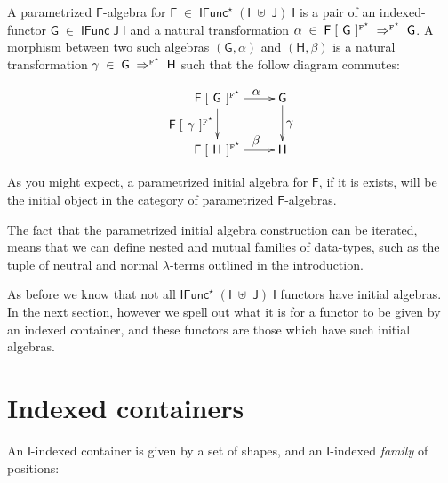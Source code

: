 \documentclass[a4paper]{article}
\newcommand{\Conid}[1]{\mathit{#1}}
\newcommand{\Varid}[1]{\mathit{#1}}
\renewcommand\Varid[1]{\mathord{\textsf{#1}}}
\let\Conid\Varid
\begin{document}
\noindent
A parametrized \ensuremath{\Conid{F}}-algebra for \ensuremath{\Conid{F}\;\in\;\Conid{IFunc}^{\star}\;(\Conid{I}\;\uplus\;\Conid{J})\;\Conid{I}} is a pair of an 
indexed-functor \ensuremath{\Conid{G}\;\in\;\Conid{IFunc}\;\Conid{J}\;\Conid{I}} and a natural transformation
\ensuremath{\alpha\;\in\;\Conid{F}\;[\mskip1.5mu \;\Conid{G}\;\mskip1.5mu]^{\text{\tiny{F}}^{\star}}\;\Rightarrow^{\text{\tiny F}^{\star}}\;\Conid{G}}. A morphism between two such algebras 
\ensuremath{(\Conid{G},\alpha)} and \ensuremath{(\Conid{H},\beta)} is a natural transformation \ensuremath{\gamma\;\in\;\Conid{G}\;\Rightarrow^{\text{\tiny F}^{\star}}\;\Conid{H}} 
such that the follow diagram commutes:

\[
\xymatrix{
\mbox{\ensuremath{\Conid{F}\;[\mskip1.5mu \;\Conid{G}\;\mskip1.5mu]^{\text{\tiny{F}}^{\star}}}}  \ar[r]^{\quad\mbox{\ensuremath{\alpha}}} 
\ar[d]_{\mbox{\ensuremath{\Conid{F}\;[\mskip1.5mu \;\gamma\;\mskip1.5mu]^{\text{\tiny{F}}^{\star}}}}} & \mbox{\ensuremath{\Conid{G}}} \ar[d]^{\mbox{\ensuremath{\gamma}}}\\
\mbox{\ensuremath{\Conid{F}\;[\mskip1.5mu \;\Conid{H}\;\mskip1.5mu]^{\text{\tiny{F}}^{\star}}}} \ar[r]^{\quad\mbox{\ensuremath{\beta}}} & \mbox{\ensuremath{\Conid{H}}}}
\]

\noindent
As you might expect, a parametrized initial algebra for \ensuremath{\Conid{F}}, if it is exists, 
will be the initial object in the category of parametrized \ensuremath{\Conid{F}}-algebras. 

The fact that the parametrized initial algebra construction can be iterated, 
means that we can define nested and mutual families of data-types, such as the
tuple of neutral and normal \ensuremath{\lambda}-terms outlined in the introduction. 

As before we know that not all \ensuremath{\Conid{IFunc}^{\star}\;(\Conid{I}\;\uplus\;\Conid{J})\;\Conid{I}} functors have initial 
algebras. In the next section, however we spell out what it is for a functor to 
be given by an indexed container, and these functors are those which have such 
initial algebras.



\section{Indexed containers}
\label{sec:icont}


An \ensuremath{\Conid{I}}-indexed container is given by a set of shapes, and an \ensuremath{\Conid{I}}-indexed \emph{family} of positions:
\end{document}
